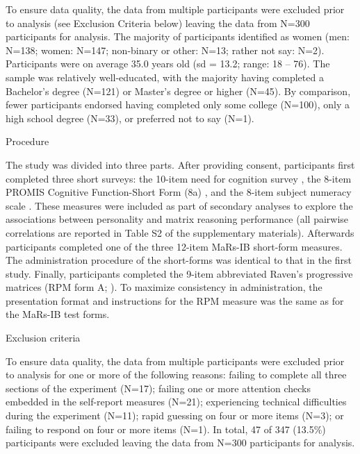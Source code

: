 \documentclass[a4paper,man,natbib]{apa6}
\makeatletter
\renewcommand{\subsubsection}{\@startsection{subsubsection}{3}
  {\z@}%
  {\b@level@two@skip}{\e@level@two@skip}%
  {\normalfont\normalsize\bfseries}}
\makeatother
\begin{document}
To ensure data quality, the data from multiple participants were excluded prior to analysis (see Exclusion Criteria below) leaving the data from N=300 participants for analysis. The majority of participants identified as women (men: N=138; women: N=147; non-binary or other: N=13; rather not say: N=2). Participants were on average 35.0 years old (sd = 13.2; range: 18 -- 76). The sample was relatively well-educated, with the majority having completed a Bachelor's degree (N=121) or Master's degree or higher (N=45). By comparison, fewer participants endorsed having completed only some college (N=100), only a high school degree (N=33), or preferred not to say (N=1). 

\subsubsection{Procedure}

The study was divided into three parts. After providing consent, participants first completed three short surveys: the 10-item need for cognition survey \citep{chiesi2018applying}, the 8-item PROMIS Cognitive Function-Short Form (8a) \citep{iverson2021normative}, and the 8-item subject numeracy scale \citep{fagerlin2007measuring}. These measures were included as part of secondary analyses  to explore the associations between personality and matrix reasoning performance (all pairwise correlations are reported in Table S2 of the supplementary materials). Afterwards participants completed one of the three 12-item MaRs-IB short-form measures. The administration procedure of the short-forms was identical to that in the first study. Finally, participants completed the 9-item abbreviated Raven's progressive matrices (RPM form A; \citealt{bilker2012development}). To maximize consistency in administration, the presentation format and instructions for the RPM measure was the same as for the MaRs-IB test forms.

\subsubsection{Exclusion criteria}

To ensure data quality, the data from multiple participants were excluded prior to analysis for one or more of the following reasons: failing to complete all three sections of the experiment (N=17); failing one or more attention checks \citep{zorowitz2021inattentive} embedded in the self-report measures (N=21); experiencing technical difficulties during the experiment (N=11); rapid guessing on four or more items (N=3); or failing to respond on four or more items (N=1). In total, 47 of 347 (13.5\%) participants were excluded leaving the data from N=300 participants for analysis.
\end{document}
